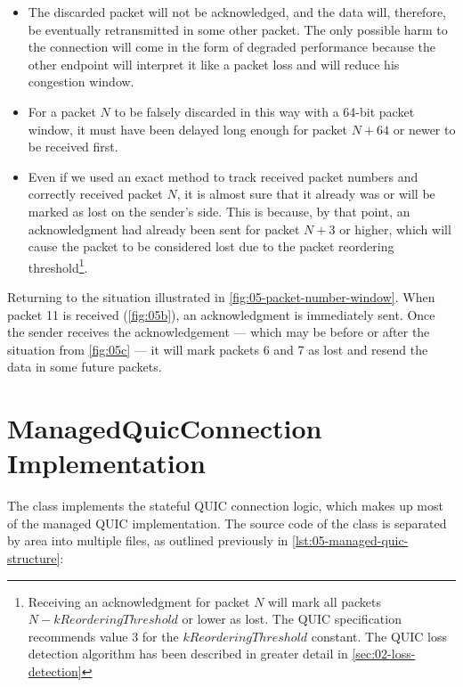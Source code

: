 \begin{itemize}

  \item The discarded packet will not be acknowledged, and the data will, therefore, be eventually
retransmitted in some other packet. The only possible harm to the connection will come in the form
of degraded performance because the other endpoint will interpret it like a packet loss and will
reduce his congestion window.

  \item For a packet $N$ to be falsely discarded in this way with a 64-bit packet window, it must
have been delayed long enough for packet $N+64$ or newer to be received first.

  \item Even if we used an exact method to track received packet numbers and correctly received
packet $N$, it is almost sure that it already was or will be marked as lost on the sender's side.
This is because, by that point, an acknowledgment had already been sent for packet $N+3$ or higher,
which will cause the packet to be considered lost due to the packet reordering
threshold\footnote{Receiving an acknowledgment for packet $N$ will mark all packets
$N - kReorderingThreshold$ or lower as lost. The QUIC specification recommends value 3 for the
$kReorderingThreshold$ constant. The QUIC loss detection algorithm has been described in greater
detail in \autoref{sec:02-loss-detection}}.

\end{itemize}

Returning to the situation illustrated in \autoref{fig:05-packet-number-window}. When packet 11 is
received (\autoref{fig:05b}), an acknowledgment is immediately sent. Once the sender receives the
acknowledgement --- which may be before or after the situation from \autoref{fig:05c} --- it will mark
packets 6 and 7 as lost and resend the data in some future packets.

\section{ManagedQuicConnection Implementation}

The \ManagedQuicConnection{} class implements the stateful QUIC connection logic, which makes up
most of the managed QUIC implementation. The source code of the \ManagedQuicConnection{} class is
separated by area into multiple files, as outlined previously in
\autoref{lst:05-managed-quic-structure}:

